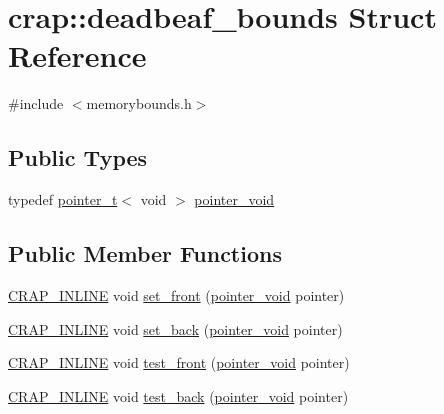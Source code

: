 \hypertarget{structcrap_1_1deadbeaf__bounds}{}\section{crap\+:\+:deadbeaf\+\_\+bounds Struct Reference}
\label{structcrap_1_1deadbeaf__bounds}


{\ttfamily \#include $<$memorybounds.\+h$>$}

\subsection*{Public Types}
\begin{DoxyCompactItemize}
\item 
typedef \hyperlink{structcrap_1_1pointer__t}{pointer\+\_\+t}$<$ void $>$ \hyperlink{structcrap_1_1deadbeaf__bounds_ab42e3320a8d0a0039e0939887805fc32}{pointer\+\_\+void}
\end{DoxyCompactItemize}
\subsection*{Public Member Functions}
\begin{DoxyCompactItemize}
\item 
\hyperlink{config__x86_8h_a5a40526b8d842e7ff731509998bb0f1c}{C\+R\+A\+P\+\_\+\+I\+N\+L\+I\+N\+E} void \hyperlink{structcrap_1_1deadbeaf__bounds_adde058c6ef61f0812ff8f9f18805947c}{set\+\_\+front} (\hyperlink{structcrap_1_1deadbeaf__bounds_ab42e3320a8d0a0039e0939887805fc32}{pointer\+\_\+void} pointer)
\item 
\hyperlink{config__x86_8h_a5a40526b8d842e7ff731509998bb0f1c}{C\+R\+A\+P\+\_\+\+I\+N\+L\+I\+N\+E} void \hyperlink{structcrap_1_1deadbeaf__bounds_ad6087771e5f72de081c551a85ad16ea6}{set\+\_\+back} (\hyperlink{structcrap_1_1deadbeaf__bounds_ab42e3320a8d0a0039e0939887805fc32}{pointer\+\_\+void} pointer)
\item 
\hyperlink{config__x86_8h_a5a40526b8d842e7ff731509998bb0f1c}{C\+R\+A\+P\+\_\+\+I\+N\+L\+I\+N\+E} void \hyperlink{structcrap_1_1deadbeaf__bounds_a783d317ac4507d5e683c2534991301db}{test\+\_\+front} (\hyperlink{structcrap_1_1deadbeaf__bounds_ab42e3320a8d0a0039e0939887805fc32}{pointer\+\_\+void} pointer)
\item 
\hyperlink{config__x86_8h_a5a40526b8d842e7ff731509998bb0f1c}{C\+R\+A\+P\+\_\+\+I\+N\+L\+I\+N\+E} void \hyperlink{structcrap_1_1deadbeaf__bounds_a51a464e98298278b46a2593644fbe1cb}{test\+\_\+back} (\hyperlink{structcrap_1_1deadbeaf__bounds_ab42e3320a8d0a0039e0939887805fc32}{pointer\+\_\+void} pointer)
\end{DoxyCompactItemize}
